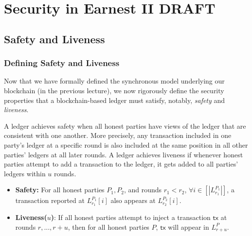 \chapter{Security in Earnest II \small{\textsf{DRAFT}}}\label{chapter.earnest2}
\section{Safety and Liveness}

\subsection{Defining Safety and Liveness}
Now that we have formally defined the synchronous model underlying our blockchain (in the previous lecture), we now rigorously define the security properties that a blockchain-based ledger must satisfy, notably, \textit{safety} and \textit{liveness}.


A ledger achieves safety when all honest parties have views of the ledger that are consistent with one another. More precisely, any transaction included in one party's ledger at a specific round is also included at the same position in all other parties' ledgers at all later rounds.
A ledger achieves liveness if whenever honest parties attempt to add a transaction to the ledger, it gets added to all parties' ledgers within $u$ rounds.

\begin{itemize}
\item \textbf{Safety:} For all honest parties $P_1, P_2$, and rounds $r_1 < r_2$,
$\forall i \in [|L_{r_1}^{P_1}|]$,
a transaction reported at
$L^{P_1}_{r_1}[i]$ also appears at $L^{P_2}_{r_2}[i]$.

\item \textbf{Liveness($u$)}: If all honest parties attempt to inject a transaction $\mathsf{tx}$ at rounds $r,...,r+u$, then for all honest parties $P$, $\mathsf{tx}$ will appear in $L_{r+u}^P$.
\end{itemize}

